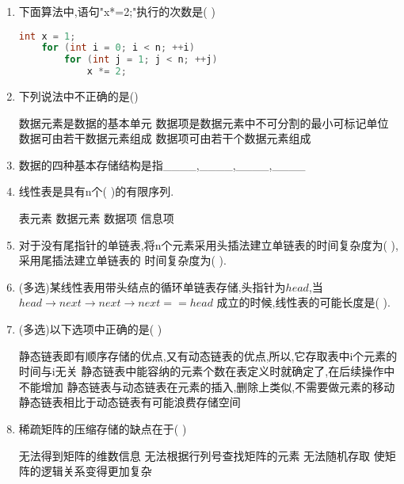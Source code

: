 \documentclass[12pt, a4paper, oneside, UTF8]{ctexbook}
\begin{document}
\begin{enumerate}
    \item 下面算法中,语句"x*=2;"执行的次数是(   ) 
    \begin{lstlisting}[language=C]
    int x = 1;
    for (int i = 0; i < n; ++i)
        for (int j = 1; j < n; ++j)
            x *= 2;
    \end{lstlisting}

    \item 下列说法中不正确的是() 
    \begin{choices}[1]
        \task 数据元素是数据的基本单元
        \task 数据项是数据元素中不可分割的最小可标记单位
        \task 数据可由若干数据元素组成 
        \task 数据项可由若干个数据元素组成 
    \end{choices}

    \item 数据的四种基本存储结构是指\_\_\_\_,\_\_\_\_,\_\_\_\_,\_\_\_\_ 

    \item 线性表是具有n个(    )的有限序列. 
    \begin{choices}
        \task 表元素 
        \task 数据元素 
        \task 数据项 
        \task 信息项 
    \end{choices}

    \item 对于没有尾指针的单链表,将n个元素采用头插法建立单链表的时间复杂度为(    ),采用尾插法建立单链表的
    时间复杂度为(    ). 

    \item (多选)某线性表用带头结点的循环单链表存储,头指针为$head$,当$head\rightarrow next\rightarrow next \rightarrow next == head$
    成立的时候,线性表的可能长度是(    ). 

    \item (多选)以下选项中正确的是(   ) 
    \begin{choices}[1]
        \task 静态链表即有顺序存储的优点,又有动态链表的优点,所以,它存取表中i个元素的时间与i无关 
        \task 静态链表中能容纳的元素个数在表定义时就确定了,在后续操作中不能增加 
        \task 静态链表与动态链表在元素的插入,删除上类似,不需要做元素的移动 
        \task 静态链表相比于动态链表有可能浪费存储空间 
    \end{choices}

    \item 稀疏矩阵的压缩存储的缺点在于(  ) 
    \begin{choices}[2]
        \task 无法得到矩阵的维数信息 
        \task 无法根据行列号查找矩阵的元素 
        \task 无法随机存取 
        \task 使矩阵的逻辑关系变得更加复杂 
    \end{choices}


\end{enumerate}
\end{document}
